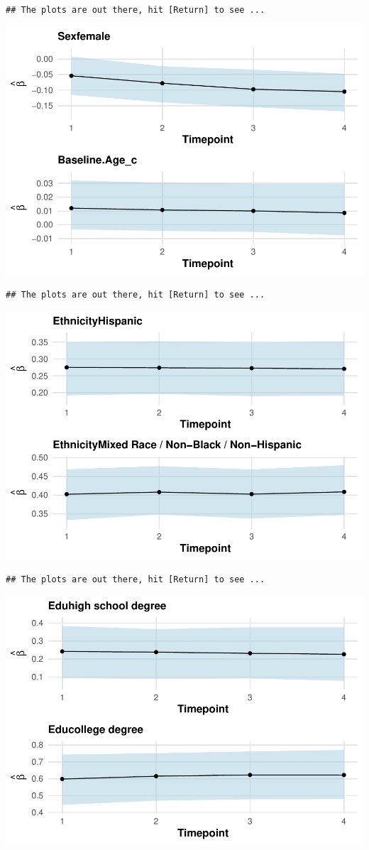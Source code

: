 \documentclass[a4paper, preprint, 3p,
authoryear]{elsarticle} %
\begin{document}
\begin{verbatim}
## The plots are out there, hit [Return] to see ...
\end{verbatim}

\includegraphics[width=0.7\linewidth]{Vignette-for-panelTVP_files/figure-latex/myplot-2}

\begin{verbatim}
## The plots are out there, hit [Return] to see ...
\end{verbatim}

\includegraphics[width=0.7\linewidth]{Vignette-for-panelTVP_files/figure-latex/myplot-3}

\begin{verbatim}
## The plots are out there, hit [Return] to see ...
\end{verbatim}

\includegraphics[width=0.7\linewidth]{Vignette-for-panelTVP_files/figure-latex/myplot-4}
\end{document}
